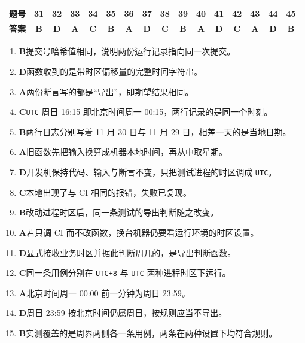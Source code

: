 \documentclass[UTF8, zihao=5, a4paper, fontset=fandol]{ctexart}
\begin{document}


\begin{center}
\setlength{\tabcolsep}{4.8pt}
\renewcommand{\arraystretch}{1.35}
\begin{tabular}{|c|c|c|c|c|c|c|c|c|c|c|c|c|c|c|c|}
\hline
\textbf{题号} & 31 & 32 & 33 & 34 & 35 & 36 & 37 & 38 & 39 & 40 & 41 & 42 & 43 & 44 & 45 \\
\hline
\textbf{答案} & \textbf{B} & \textbf{D} & \textbf{A} & \textbf{C} & \textbf{B} & \textbf{A} & \textbf{D} & \textbf{C} & \textbf{B} & \textbf{A} & \textbf{D} & \textbf{C} & \textbf{A} & \textbf{D} & \textbf{B} \\
\hline
\end{tabular}
\end{center}

\begin{enumerate}[label=\textbf{\arabic*.}, start=31, leftmargin=2.2em, itemsep=2pt, topsep=3pt]
  \item \textbf{B}\quad 提交号哈希值相同，说明两份运行记录指向同一次提交。
  \item \textbf{D}\quad 函数收到的是带时区偏移量的完整时间字符串。
  \item \textbf{A}\quad 两份断言写的都是“导出”，即期望结果相同。
  \item \textbf{C}\quad \texttt{UTC} 周日 16:15 即北京时间周一 00:15，两行记录的是同一个时刻。
  \item \textbf{B}\quad 两行日志分别写着 11 月 30 日与 11 月 29 日，相差一天的是当地日期。
  \item \textbf{A}\quad 旧函数先把输入换算成机器本地时间，再从中取星期。
  \item \textbf{D}\quad 开发机保持代码、输入与断言不变，只把测试进程的时区调成 \texttt{UTC}。
  \item \textbf{C}\quad 本地出现了与 CI 相同的报错，失败已复现。
  \item \textbf{B}\quad 改动进程时区后，同一条测试的导出判断随之改变。
  \item \textbf{A}\quad 若只调 CI 而不改函数，换台机器仍要看运行环境的时区设置。
  \item \textbf{D}\quad 显式接收业务时区并据此判断周几的，是导出判断函数。
  \item \textbf{C}\quad 同一条用例分别在 \texttt{UTC+8} 与 \texttt{UTC} 两种进程时区下运行。
  \item \textbf{A}\quad 北京时间周一 00:00 前一分钟为周日 23:59。
  \item \textbf{D}\quad 周日 23:59 按北京时间仍属周日，按规则应当不导出。
  \item \textbf{B}\quad 实测覆盖的是周界两侧各一条用例，两条在两种设置下均符合规则。
\end{enumerate}
\end{document}
